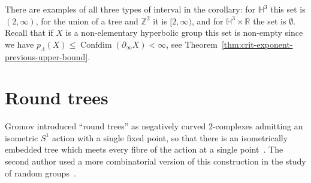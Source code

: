 \documentclass[11pt]{amsart}
\numberwithin{equation}{section}
\theoremstyle{citing}
\DeclareMathOperator{\Confdim}{Confdim}
\newcommand{\bdry}{\partial_\infty}
\newcommand{\R}{\mathbb{R}}
\newcommand{\Z}{\mathbb{Z}}
\newcommand{\HH}{\mathbb{H}}
\newcommand{\pcrit}{p_{\Lambda}}
\numberwithin{equation}{section}
\begin{document}
There are examples of all three types of interval in the corollary: for $\HH^3$ this set is $(2,\infty)$, 
for the union of a tree and $\Z^2$ it is $[2,\infty)$,
and for $\HH^3\times\R$ the set is $\emptyset$.
Recall that if $X$ is a non-elementary hyperbolic group this set is non-empty since we have $\pcrit(X) \leq \Confdim(\bdry X) < \infty$, see Theorem~\ref{thm:crit-exponent-previous-upper-bound}. 



\section{Round trees}
\label{sec:round-trees}

Gromov introduced ``round trees'' as negatively curved $2$-complexes admitting an isometric $S^1$ action with a single fixed point, so that there is an isometrically embedded tree which meets every fibre of the action at a single point~\cite[\S 7.C$_3$]{Gromov93}.
The second author used a more combinatorial version of this construction in the study of random groups~\cite{Mac-12-random-cdim, Mac-16-confdim-subcplxs}.
\end{document}
